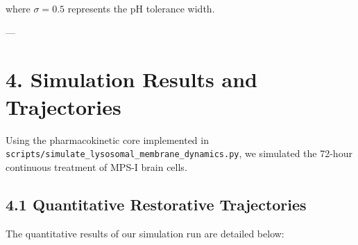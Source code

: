 \documentclass[11pt,twocolumn]{article}
\begin{document}
where $\sigma = 0.5$ represents the pH tolerance width.

---

\section{4. Simulation Results and Trajectories}
Using the pharmacokinetic core implemented in \texttt{scripts/simulate_lysosomal_membrane_dynamics.py}, we simulated the 72-hour continuous treatment of MPS-I brain cells.

\subsection{4.1 Quantitative Restorative Trajectories}
The quantitative results of our simulation run are detailed below:
\end{document}
